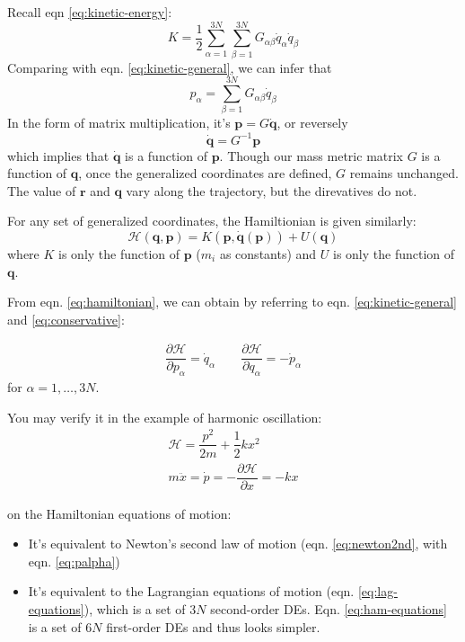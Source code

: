 \documentclass[
  10pt,
  twoside,
  openany,
  b5paper, %
  colorscheme = bootstrap-v4, %
]{qyxf-book}
\numberwithin{equation}{section}
\newcommand{\p}[2]{\dfrac{\partial #1}{\partial #2}}
\newcommand{\vr}{\boldsymbol{r}}
\newcommand{\vp}{\boldsymbol{p}}
\newcommand{\vq}{\boldsymbol{q}}
\newcommand{\dvq}{\dot{\vq}}
\newcommand{\half}{\dfrac{1}{2}}
\newcommand{\suman}{\sum_{\alpha=1}^{3N}}
\newcommand{\ham}{\mathcal{H}} %
\begin{document}
Recall eqn \ref{eq:kinetic-energy}:
\begin{equation*}
	K=\half\suman\sum_{\beta=1}^{3N}G_{\alpha\beta}\dot{q}_\alpha\dot{q}_\beta
\end{equation*}
Comparing with eqn. \ref{eq:kinetic-general}, we can infer that
\begin{equation}
	p_\alpha=\sum_{\beta=1}^{3N}G_{\alpha\beta}\dot{q}_\beta
\end{equation}
In the form of matrix multiplication, it's $\vp=G\dvq$, or reversely
\begin{equation}
	\dvq=G^{-1}\vp
\end{equation}
which implies that $\dvq$ is a function of $\vp$. Though our mass metric matrix $G$ is a function of $\vq$, once the generalized coordinates are defined, $G$ remains unchanged. The value of $\vr$ and $\vq$ vary along the trajectory, but the direvatives do not.

For any set of generalized coordinates, the Hamiltionian is given similarly:
\begin{equation}
	\ham(\vq,\vp)=K(\vp,\dvq(\vp))+U(\vq) \label{eq:hamiltonian}
\end{equation}
where $K$ is only the function of $\vp$ ($m_i$ as constants) and $U$ is only the function of $\vq$.

From eqn. \ref{eq:hamiltonian}, we can obtain by referring to eqn. \ref{eq:kinetic-general} and \ref{eq:conservative}:
\begin{tcolorbox}[title={Hamiltonian's equations of motion}]
	\begin{gather}
		\p{\ham}{p_\alpha}=\dot{q}_\alpha \qquad \p{\ham}{q_\alpha}=-\dot{p}_\alpha
		\label{eq:ham-equations}
	\end{gather}
	for $\alpha=1,\dots,3N$. 
\end{tcolorbox}

\example You may verify it in the example of harmonic oscillation:
\begin{gather*}
	\ham=\dfrac{p^2}{2m}+\half kx^2\\
	m\ddot{x}=\dot{p}=-\p{\ham}{x}=-kx
\end{gather*}

\mynote on the Hamiltonian equations of motion:
\begin{itemize}
	\item It's equivalent to Newton's second law of motion (eqn. \ref{eq:newton2nd}, with eqn. \ref{eq:palpha})
	\item It's equivalent to the Lagrangian equations of motion (eqn. \ref{eq:lag-equations}), which is a set of $3N$ second-order DEs. Eqn. \ref{eq:ham-equations} is a set of $6N$ first-order DEs and thus looks simpler.
\end{itemize}
\end{document}
